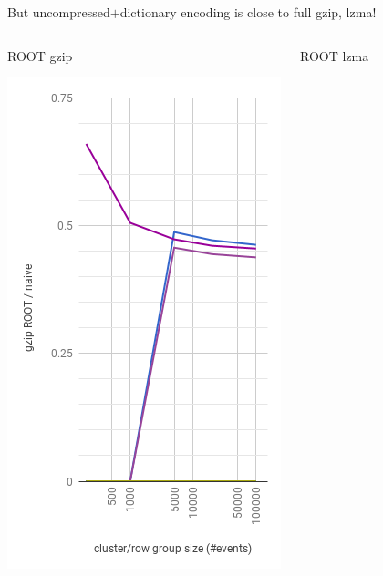\documentclass[aspectratio=169]{beamer}
\begin{document}
\begin{frame}{But uncompressed$+$dictionary encoding is close to full gzip, lzma!}
\begin{columns}
\begin{center}
\mbox{\hspace{3 cm}}
ROOT gzip

\includegraphics[width=\linewidth]{root-gzip-2.png}
\end{center}
\begin{center}
\mbox{\hspace{3 cm}}
ROOT lzma


\end{center}
\end{columns}
\end{frame}
\end{document}
